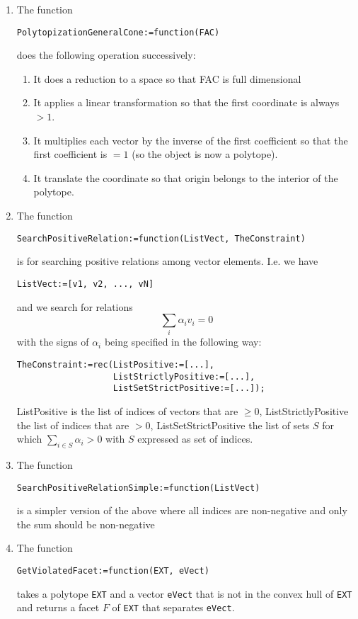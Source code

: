 \documentclass[12pt]{amsart}
\begin{document}
\begin{enumerate}
\item The function
\begin{verbatim}
PolytopizationGeneralCone:=function(FAC)
\end{verbatim}
does the following operation successively:
\begin{enumerate}
\item It does a reduction to a space so that FAC is full dimensional
\item It applies a linear transformation so that the first coordinate is always $>1$.
\item It multiplies each vector by the inverse of the first coefficient so that
the first coefficient is $=1$ (so the object is now a polytope).
\item It translate the coordinate so that origin belongs to the interior of the polytope.
\end{enumerate}

\item The function
\begin{verbatim}
SearchPositiveRelation:=function(ListVect, TheConstraint)
\end{verbatim}
is for searching positive relations among vector elements. I.e. we have
\begin{verbatim}
ListVect:=[v1, v2, ..., vN]
\end{verbatim}
and we search for relations
\begin{equation*}
\sum_i \alpha_i v_i = 0
\end{equation*}
with the signs of $\alpha_i$ being specified in the following way:
\begin{verbatim}
TheConstraint:=rec(ListPositive:=[...], 
                   ListStrictlyPositive:=[...],
                   ListSetStrictPositive:=[...]);
\end{verbatim}
ListPositive is the list of indices of vectors that are $\geq 0$,
ListStrictlyPositive the list of indices that are $>0$,
ListSetStrictPositive the list of sets $S$ for which $\sum_{i\in S} \alpha_i >0$ with $S$ expressed as set of indices.

\item The function
\begin{verbatim}
SearchPositiveRelationSimple:=function(ListVect)
\end{verbatim}
is a simpler version of the above where all indices are non-negative and only the sum should be non-negative


\item The function
\begin{verbatim}
GetViolatedFacet:=function(EXT, eVect)
\end{verbatim}
takes a polytope {\tt EXT} and a vector {\tt eVect} that is not in the convex hull of {\tt EXT} and returns a facet $F$ of {\tt EXT} that separates {\tt eVect}.



\end{enumerate}
\end{document}
